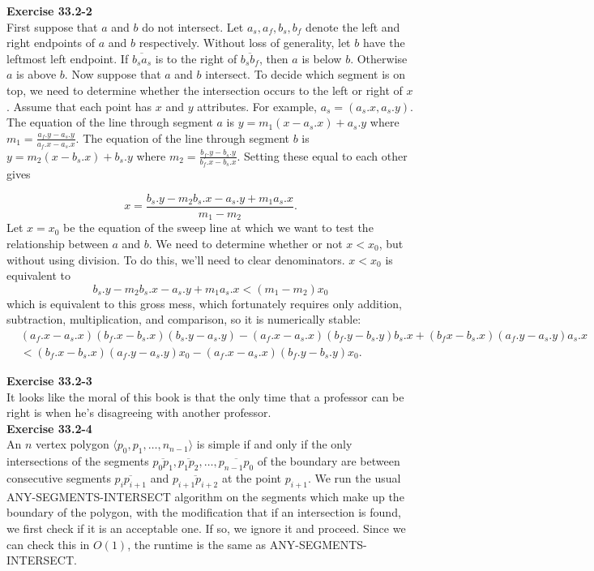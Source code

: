 \documentclass{article}
\begin{document}
\noindent\textbf{Exercise 33.2-2}\\

First suppose that $a$ and $b$ do not intersect.  Let $a_s, a_f, b_s, b_f$ denote the left and right endpoints of $a$ and $b$ respectively.  Without loss of generality, let $b$ have the leftmost left endpoint.  If $\overline{b_s a_s}$ is to the right of $\overline{b_s b_f}$, then $a$ is below $b$. Otherwise $a$ is above $b$.  Now suppose that $a$ and $b$ intersect.  To decide which segment is on top, we need to determine whether the intersection occurs to the left or right of $x$.  Assume that each point has $x$ and $y$ attributes.  For example, $a_s = (a_s.x, a_s.y)$.  The equation of the line through segment $a$ is $y = m_1(x-a_s.x) + a_s.y$ where $m_1 = \frac{a_f.y-a_s.y}{a_f.x-a_s.x}$.  The equation of the line through segment $b$ is $y = m_2(x-b_s.x) + b_s.y$ where $m_2 = \frac{b_f.y-b_s.y}{b_f.x-b_s.x}$.  Setting these equal to each other gives 

\[ x = \frac{b_s.y-m_2b_s.x - a_s.y + m_1 a_s.x}{m_1-m_2}.\]
Let $x = x_0$ be the equation of the sweep line at which we want to test the relationship between $a$ and $b$.  We need to determine whether or not $x < x_0$, but without using division.  To do this, we'll need to clear denominators.  $x < x_0$ is equivalent to 
\[b_s.y-m_2b_s.x - a_s.y + m_1 a_s.x < (m_1 - m_2)x_0\]
which is equivalent to this gross mess, which fortunately requires only addition, subtraction, multiplication, and comparison, so it is numerically stable:
\begin{align*}
&(a_f.x - a_s.x)(b_f.x-b_s.x)(b_s.y-a_s.y) - (a_f.x - a_s.x)(b_f.y-b_s.y)b_s.x + (b_fx-b_s.x)(a_f.y-a_s.y)a_s.x \\
&< (b_f.x-b_s.x)(a_f.y-a_s.y)x_0 - (a_f.x-a_s.x)(b_f.y-b_s.y)x_0.
\end{align*}


\noindent\textbf{Exercise 33.2-3}\\

It looks like the moral of this book is that the only time that a professor can be right is when he's disagreeing with another professor.\\%

\noindent\textbf{Exercise 33.2-4}\\

An $n$ vertex polygon $\langle p_0,p_1,\ldots,n_{n-1}\rangle$ is simple if and only if the only intersections of the segments $\overline{p_0 p_1}, \overline{p_1 p_2}, \ldots, \overline{p_{n-1}p_0}$ of the boundary are between consecutive segments $\overline{p_{i}p_{i+1}}$ and $\overline{p_{i+1}p_{i+2}}$ at the point $p_{i+1}$.   We run the usual ANY-SEGMENTS-INTERSECT algorithm on the segments which make up the boundary of the polygon, with the modification that if an intersection is found, we first check if it is an acceptable one. If so, we ignore it and proceed.  Since we can check this in $O(1)$, the runtime is the same as ANY-SEGMENTS-INTERSECT.
\\
\end{document}
